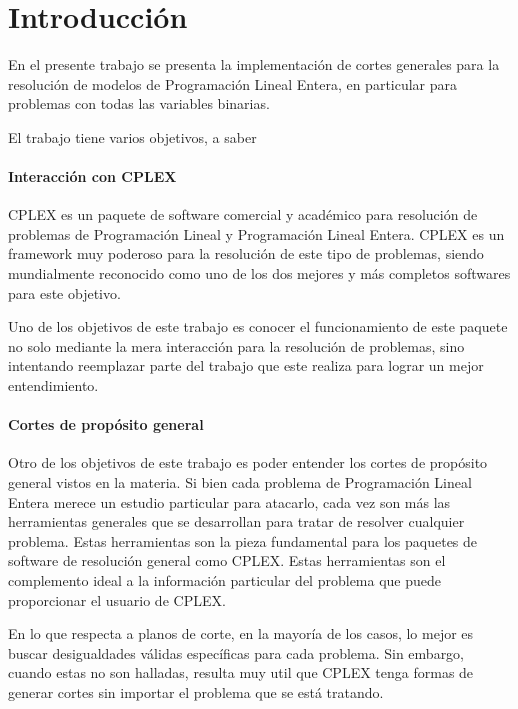 \section{Introducci\'on}

En el presente trabajo se presenta la implementaci\'on de cortes generales para la resoluci\'on de modelos de Programaci\'on Lineal Entera, en particular para problemas con todas las variables binarias.

El trabajo tiene varios objetivos, a saber

\paragraph{Interacci\'on con CPLEX} 
\medskip
CPLEX es un paquete de software comercial y acad\'emico para resoluci\'on de problemas de Programaci\'on Lineal y Programaci\'on Lineal Entera. CPLEX es un framework muy poderoso para la resoluci\'on de este tipo de problemas, siendo mundialmente reconocido como uno de los dos mejores y m\'as completos softwares para este objetivo.

Uno de los objetivos de este trabajo es conocer el funcionamiento de este paquete no solo mediante la mera interacci\'on para la resoluci\'on de problemas, sino intentando reemplazar parte del trabajo que este realiza para lograr un mejor entendimiento.



\paragraph{Cortes de prop\'osito general} 
\medskip
Otro de los objetivos de este trabajo es poder entender los cortes de prop\'osito general vistos en la materia. Si bien cada problema de Programaci\'on Lineal Entera merece un estudio particular para atacarlo, cada vez son m\'as las herramientas generales que se desarrollan para tratar de resolver cualquier problema. Estas herramientas son la pieza fundamental para los paquetes de software de resoluci\'on general como CPLEX. Estas herramientas son el complemento ideal a la informaci\'on particular del problema que puede proporcionar el usuario de CPLEX.

En lo que respecta a planos de corte, en la mayor\'ia de los casos, lo mejor es buscar desigualdades v\'alidas espec\'ificas para cada problema. Sin embargo, cuando estas no son halladas, resulta muy util que CPLEX tenga formas de generar cortes sin importar el problema que se est\'a tratando. 

